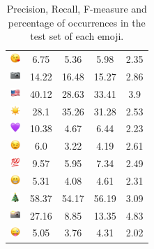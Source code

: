 \documentclass{article}
\begin{document}
\begin{table}
\begin{tabular}{|c|ccc|c|}
\includegraphics[height=0.37cm,width=0.37cm]{img/face_blowing_a_kiss.png} & 6.75 & 5.36 & 5.98 & 2.35\\ 
\includegraphics[height=0.37cm,width=0.37cm]{img/camera.png} & 14.22 & 16.48 & 15.27 & 2.86\\ 
\includegraphics[height=0.37cm,width=0.37cm]{img/United_States.png} & 40.12 & 28.63 & 33.41 & 3.9\\ 
\includegraphics[height=0.37cm,width=0.37cm]{img/sun.png} & 28.1 & 35.26 & 31.28 & 2.53\\ 
\includegraphics[height=0.37cm,width=0.37cm]{img/purple_heart.png} & 10.38 & 4.67 & 6.44 & 2.23\\ 
\includegraphics[height=0.37cm,width=0.37cm]{img/winking_face.png} & 6.0 & 3.22 & 4.19 & 2.61\\ 
\includegraphics[height=0.37cm,width=0.37cm]{img/hundred_points.png} & 9.57 & 5.95 & 7.34 & 2.49\\ 
\includegraphics[height=0.37cm,width=0.37cm]{img/beaming_face_with_smiling_eyes.png} & 5.31 & 4.08 & 4.61 & 2.31\\ 
\includegraphics[height=0.37cm,width=0.37cm]{img/Christmas_tree.png} & 58.37 & 54.17 & 56.19 & 3.09\\ 
\includegraphics[height=0.37cm,width=0.37cm]{img/camera_with_flash.png} & 27.16 & 8.85 & 13.35 & 4.83\\ 
\includegraphics[height=0.37cm,width=0.37cm]{img/winking_face_with_tongue.png} & 5.05 & 3.76 & 4.31 & 2.02\\ 

\hline
\end{tabular}
\caption{\label{table:emoji_detailed} Precision, Recall, F-measure and percentage of occurrences in the test set of each emoji.}
\end{table}
\end{document}
